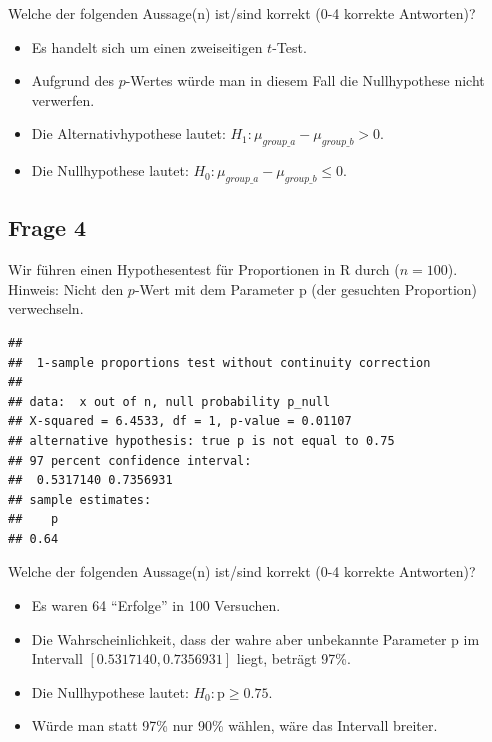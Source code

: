 \documentclass[
]{book}
\providecommand{\tightlist}{%
  \setlength{\itemsep}{0pt}\setlength{\parskip}{0pt}}
\begin{document}
Welche der folgenden Aussage(n) ist/sind korrekt (0-4 korrekte Antworten)?

\begin{itemize}
\tightlist
\item
  Es handelt sich um einen zweiseitigen \(t\)-Test.
\item
  Aufgrund des \(p\)-Wertes würde man in diesem Fall die Nullhypothese nicht verwerfen.
\item
  Die Alternativhypothese lautet: \(H_1: \mu_{group\_a} - \mu_{group\_b} > 0\).
\item
  Die Nullhypothese lautet: \(H_0: \mu_{group\_a} - \mu_{group\_b} \le 0\).
\end{itemize}

\subsection{Frage 4}\label{frage-4-1}

Wir führen einen Hypothesentest für Proportionen in R durch (\(n=100\)).
Hinweis: Nicht den \(p\)-Wert mit dem Parameter p (der gesuchten Proportion) verwechseln.

\begin{verbatim}
## 
##  1-sample proportions test without continuity correction
## 
## data:  x out of n, null probability p_null
## X-squared = 6.4533, df = 1, p-value = 0.01107
## alternative hypothesis: true p is not equal to 0.75
## 97 percent confidence interval:
##  0.5317140 0.7356931
## sample estimates:
##    p 
## 0.64
\end{verbatim}

Welche der folgenden Aussage(n) ist/sind korrekt (0-4 korrekte Antworten)?

\begin{itemize}
\tightlist
\item
  Es waren 64 ``Erfolge'' in 100 Versuchen.
\item
  Die Wahrscheinlichkeit, dass der wahre aber unbekannte Parameter p im
  Intervall \([0.5317140, 0.7356931]\) liegt, beträgt 97\%.
\item
  Die Nullhypothese lautet: \(H_0: \text{p} \ge 0.75\).
\item
  Würde man statt 97\% nur 90\% wählen, wäre das Intervall breiter.
\end{itemize}

  
\end{document}
